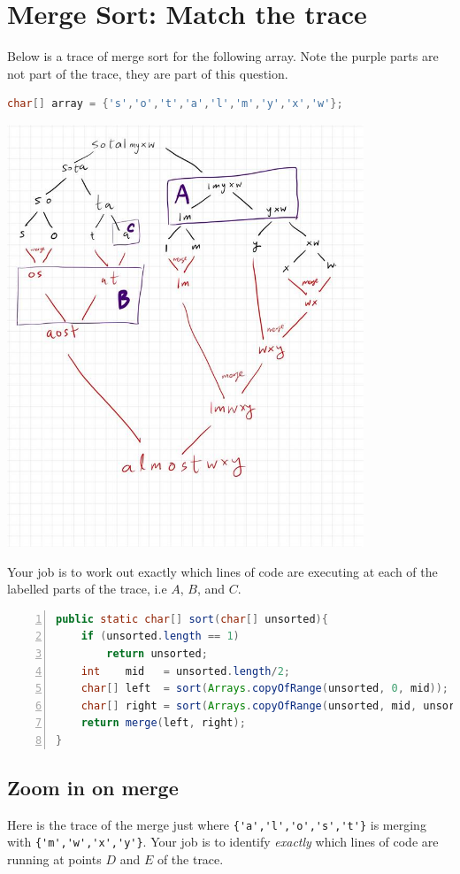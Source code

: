 \documentclass[twoside=false,DIV=14]{scrartcl}
\begin{document}
\section{Merge Sort: Match the trace}
Below is a trace of merge sort for the following array.  Note the purple parts are not part of the trace, they are part of this question.
\begin{lstlisting}[language=java]
char[] array = {'s','o','t','a','l','m','y','x','w'};
\end{lstlisting}
\includegraphics[width=0.8\textwidth]{sort_trace_plus.jpeg}

Your job is to work out exactly which lines of code are executing at each of the labelled parts of the trace, i.e $A$, $B$, and $C$.

\begin{lstlisting}[language=java,numbers=left]
public static char[] sort(char[] unsorted){
    if (unsorted.length == 1)
        return unsorted;
    int    mid   = unsorted.length/2;
    char[] left  = sort(Arrays.copyOfRange(unsorted, 0, mid));
    char[] right = sort(Arrays.copyOfRange(unsorted, mid, unsorted.length));
    return merge(left, right);
}    
\end{lstlisting}

\subsection{Zoom in on merge}
Here is the trace of the merge just where \verb|{'a','l','o','s','t'}| is merging with \verb|{'m','w','x','y'}|.  Your job is to identify \emph{exactly} which lines of code are running at points $D$ and $E$ of the trace.
\end{document}
